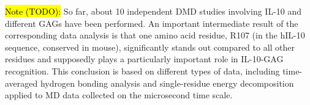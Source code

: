 \hl{Note (TODO):}
So far, about 10 independent DMD studies involving IL-10 and different GAGs
have been performed. An important intermediate result of the corresponding data
analysis is that one amino acid residue, R107 (in the hIL-10 sequence, conserved
in mouse), significantly stands out compared to all other residues and
supposedly plays a particularly important role in IL-10-GAG recognition. This
conclusion is based on different types of data, including time-averaged hydrogen
bonding analysis and single-residue energy decomposition applied to MD data
collected on the microsecond time scale.

